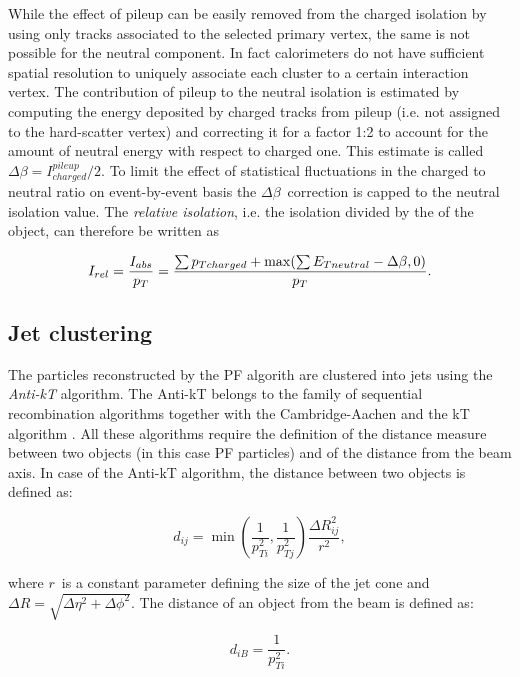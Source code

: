 While the effect of pileup can be easily removed from the charged isolation by using only tracks associated to the selected primary vertex, the same is not possible for the neutral component. In fact calorimeters do not have sufficient spatial resolution to uniquely associate each cluster to a certain interaction vertex. The contribution of pileup to the neutral isolation is estimated by computing the energy deposited by charged tracks from pileup (i.e. not assigned to the hard-scatter vertex) and correcting it for a factor 1:2 to account for the amount of neutral energy with respect to charged one. This estimate is called \emph{$\Delta\beta = I^{pileup}_{charged}/2$}. To limit the effect of statistical fluctuations in the charged to neutral ratio on event-by-event basis the $\Delta\beta$\ correction is capped to the neutral isolation value. The \emph{relative isolation}, i.e. the isolation divided by the \pT of the object, can therefore be written as

\begin{equation}
I_{rel} = \dfrac{I_{abs}}{p_{T}} =  \dfrac{\sum{p_{T charged}} + \operatorname{max}(\sum{E_{T neutral}} - \Delta \beta, 0)}{p_T}.
\label{eq:db_rel_iso}
\end{equation}

\subsection{Jet clustering}

The particles reconstructed by the PF algorith are clustered into jets using the \emph{Anti-kT} \cite{Cacciari:2008gp} algorithm. The Anti-kT belongs to the family of sequential recombination algorithms together with the Cambridge-Aachen and the kT algorithm \cite{Ellis:1993tq,Dokshitzer:1997in}. All these algorithms require the definition of the distance measure between two objects (in this case PF particles) and of the distance from the beam axis. In case of the Anti-kT algorithm, the distance between two objects is defined as:

\begin{equation}
d_{ij} = \operatorname{min}(\dfrac{1}{p_{Ti}^2},\dfrac{1}{p_{Tj}^2})\dfrac{\Delta R_{ij}^2}{r^2},
\end{equation}

where $r$\ is a constant parameter defining the size of the jet cone and $\Delta R = \sqrt{\Delta \eta^2 + \Delta \phi^2}$.
The distance of an object from  the beam is defined as:

\begin{equation}
d_{iB} = \dfrac{1}{p_{Ti}^2}.
\end{equation}

